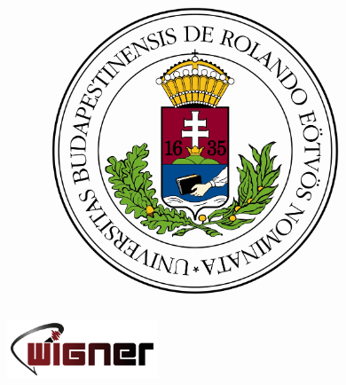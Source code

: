 \documentclass[12pt,a4paper]{report}
\begin{document}
\begin{titlepage}
\begin{figure}[H]
\begin{subfigure}{.39\textwidth}
		\includegraphics[width=.82\textwidth]{elte.jpg}
	\end{subfigure}
	\end{figure}
	\begin{figure}[H]
		\centering
		\includegraphics[width=0.4\textwidth]{wigner.png}
	\end{figure}
	\vfill
\end{titlepage}
\end{document}

